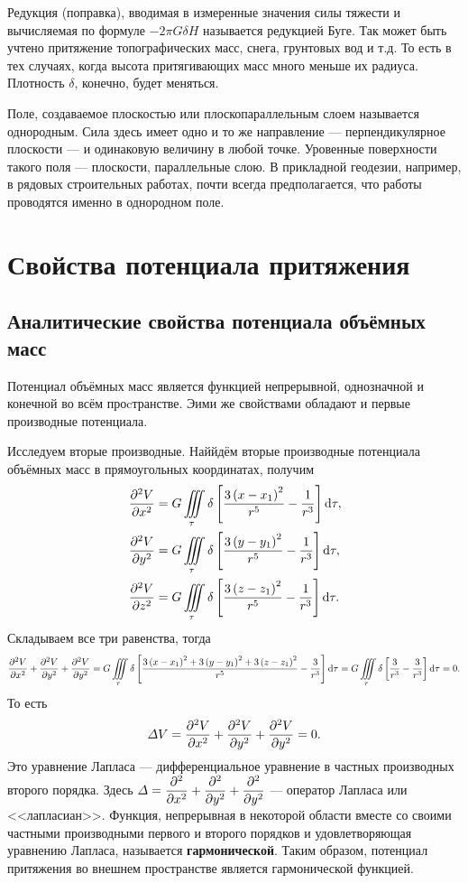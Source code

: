 \documentclass[11pt, a4paper]{article}
\theoremstyle{plain}
\theoremstyle{definition}
\theoremstyle{remark}
\begin{document}
Редукция (поправка), вводимая в измеренные значения силы тяжести и вычисляемая по формуле $-2\pi
G\delta H$ называется редукцией Буге. Так может быть учтено притяжение топографических масс, снега,
грунтовых вод и т.д. То есть в тех случаях, когда высота притягивающих масс много меньше их радиуса.
Плотность $\delta$, конечно, будет меняться.

Поле, создаваемое плоскостью или плоскопараллельным слоем называется однородным. Сила здесь имеет одно и
то же направление --- перпендикулярное плоскости --- и одинаковую величину в любой точке. Уровенные
поверхности такого поля --- плоскости, параллельные слою. В прикладной геодезии, например, в
рядовых строительных работах, почти всегда предполагается, что работы проводятся именно в однородном поле.

\section{Свойства потенциала притяжения}

\subsection{Аналитические свойства потенциала объёмных масс}
Потенциал объёмных масс является функцией непрерывной, однозначной и конечной во всём проcтранстве.
Эими же свойствами обладают и первые производные потенциала.

Исследуем вторые производные. Наййдём вторые производные потенциала объёмных масс в прямоугольных
координатах, получим
\begin{align*}
    &\dpd[2]{V}{x} = G\iiint\limits_{\tau} \delta \left[ \dfrac{3 \left( x - x_1 \right)^2}{r^5} -
    \dfrac{1}{r^3} \right]\dif\tau, \\
    &\dpd[2]{V}{y} = G\iiint\limits_{\tau} \delta \left[ \dfrac{3 \left( y - y_1 \right)^2}{r^5} -
    \dfrac{1}{r^3} \right]\dif\tau, \\
    &\dpd[2]{V}{z} = G\iiint\limits_{\tau} \delta \left[ \dfrac{3 \left( z - z_1 \right)^2}{r^5} -
    \dfrac{1}{r^3} \right]\dif\tau.
\end{align*}
Складываем все три равенства, тогда
\begin{equation*}
    \dpd[2]{V}{x} + \dpd[2]{V}{y} + \dpd[2]{V}{y} = 
    G\iiint\limits_{\tau} \delta \left[ \dfrac{3 \left( x - x_1 \right)^2 +
        3 \left( y - y_1 \right)^2 +3 \left( z - z_1 \right)^2}{r^5} - \dfrac{3}{r^3} 
    \right]\dif\tau =
    G\iiint\limits_{\tau} \delta \left[ \dfrac{3}{r^3} - \dfrac{3}{r^3} \right]\dif\tau = 0.
\end{equation*}
То есть
\begin{equation*}
    \Delta V = \dpd[2]{V}{x} + \dpd[2]{V}{y} + \dpd[2]{V}{y} = 0.
\end{equation*}
Это уравнение Лапласа --- дифференциальное уравнение в частных производных второго порядка. Здесь
$\Delta = \dpd[2]{}{x} + \dpd[2]{}{y} + \dpd[2]{}{y}$ --- оператор Лапласа или <<лапласиан>>.
Функция, непрерывная в некоторой области вместе со своими частными производными первого и второго
порядков и удовлетворяющая уравнению Лапласа, называется \textbf{гармонической}. Таким образом,
потенциал притяжения во внешнем пространстве является гармонической функцией.
\end{document}
